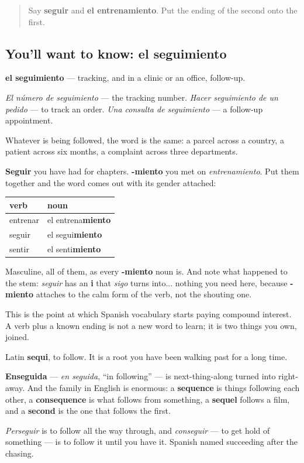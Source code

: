 \begin{quote}
Say \textbf{seguir} and \textbf{el entrenamiento}. Put the ending of the second onto the first.
\end{quote}

\subsection*{You'll want to know: el seguimiento}
\textbf{el seguimiento} — tracking, and in a clinic or an office, follow-up.

\emph{El número de seguimiento} — the tracking number. \emph{Hacer seguimiento de un pedido} — to track an order. \emph{Una consulta de seguimiento} — a follow-up appointment.

Whatever is being followed, the word is the same: a parcel across a country, a patient across six months, a complaint across three departments.

\begin{grammarlens}[title={Grammar Lens: you could have built this yourself}]
\textbf{Seguir} you have had for chapters. \textbf{-miento} you met on \emph{entrenamiento}. Put them together and the word comes out with its gender attached:

\noindent
\begin{tabularx}{\linewidth}{@{}>{\raggedright\arraybackslash}X>{\raggedright\arraybackslash}X@{}}
\toprule
\textbf{verb} & \textbf{noun} \\
\midrule
entrenar & el entrena\textbf{miento} \\
seguir & el segui\textbf{miento} \\
sentir & el senti\textbf{miento} \\
\bottomrule
\end{tabularx}

Masculine, all of them, as every \textbf{-miento} noun is. And note what happened to the stem: \emph{seguir} has an \textbf{i} that \emph{sigo} turns into... nothing you need here, because \textbf{-miento} attaches to the calm form of the verb, not the shouting one.

This is the point at which Spanish vocabulary starts paying compound interest. A verb plus a known ending is not a new word to learn; it is two things you own, joined.
\end{grammarlens}

\begin{cousinweb}
Latin \textbf{sequi}, to follow. It is a root you have been walking past for a long time.

\textbf{Enseguida} — \emph{en seguida}, \textquotedblleft{}in following\textquotedblright{} — is next-thing-along turned into right-away. And the family in English is enormous: a \textbf{sequence} is things following each other, a \textbf{consequence} is what follows from something, a \textbf{sequel} follows a film, and a \textbf{second} is the one that follows the first.

\emph{Perseguir} is to follow all the way through, and \emph{conseguir} — to get hold of something — is to follow it until you have it. Spanish named succeeding after the chasing.
\end{cousinweb}

